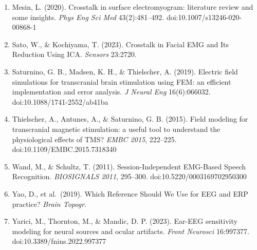\documentclass[
  11pt,
  letterpaper,
]{article}
\begin{document}
\begin{enumerate}
  Meiser, A., Knoll, J., \& Bleichner, M. G. (2024). High-density ear-EEG for understanding ear-centered EEG. \emph{J Neural Eng} 21(1):016001. doi:10.1088/1741-2552/ad1783
\item
  Mesin, L. (2020). Crosstalk in surface electromyogram: literature review and some insights. \emph{Phys Eng Sci Med} 43(2):481--492. doi:10.1007/s13246-020-00868-1
\item
  Sato, W., \& Kochiyama, T. (2023). Crosstalk in Facial EMG and Its Reduction Using ICA. \emph{Sensors} 23:2720.
\item
  Saturnino, G. B., Madsen, K. H., \& Thielscher, A. (2019). Electric field simulations for transcranial brain stimulation using FEM: an efficient implementation and error analysis. \emph{J Neural Eng} 16(6):066032. doi:10.1088/1741-2552/ab41ba
\item
  Thielscher, A., Antunes, A., \& Saturnino, G. B. (2015). Field modeling for transcranial magnetic stimulation: a useful tool to understand the physiological effects of TMS? \emph{EMBC 2015}, 222--225. doi:10.1109/EMBC.2015.7318340
\item
  Wand, M., \& Schultz, T. (2011). Session-Independent EMG-Based Speech Recognition. \emph{BIOSIGNALS 2011}, 295--300. doi:10.5220/0003169702950300
\item
  Yao, D., et al.~(2019). Which Reference Should We Use for EEG and ERP practice? \emph{Brain Topogr}.
\item
  Yarici, M., Thornton, M., \& Mandic, D. P. (2023). Ear-EEG sensitivity modeling for neural sources and ocular artifacts. \emph{Front Neurosci} 16:997377. doi:10.3389/fnins.2022.997377
\end{enumerate}
\end{document}
